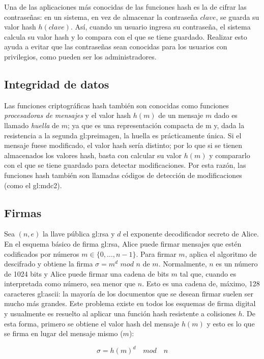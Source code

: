 Una de las aplicaciones más conocidas de las funciones hash es la de
cifrar las contraseñas: en un sistema, en vez de almacenar la contraseña
$clave$, se guarda su valor hash $h(clave)$. Así, cuando un usuario
ingresa su contraseña, el sistema calcula su valor hash y lo compara con
el que se tiene guardado. Realizar esto ayuda a evitar que las
contraseñas sean conocidas para los usuarios con privilegios, como
pueden ser los administradores.

\subsection{Integridad de datos}
Las funciones criptográficas hash también son conocidas como funciones
\textit{procesadoras de mensajes} y el valor hash $h(m)$ de un mensaje
$m$ dado es llamado \textit{huella} de $m$; ya que es una representación
compacta de m y, dada la resistencia a la segunda \gls{gl:preimagen}, la huella
es prácticamente única. Si el mensaje fuese modificado, el valor hash
sería distinto; por lo que si se tienen almacenados los valores hash,
basta con calcular su valor $h(m)$ y compararlo con el que se tiene
guardado para detectar modificaciones. Por esta razón, las funciones
hash también son llamadas códigos de detección de modificaciones (como el 
\acrshort{gl:mdc2}).

\subsection{Firmas}
Sea $(n, e)$ la llave pública \acrshort{gl:rsa} y $d$ el exponente decodificador
secreto de Alice. En el esquema básico de firma \acrshort{gl:rsa}, Alice puede 
firmar mensajes que estén codificados por números $ m \in \{0, \dots, n-1\}$.
Para firmar $m$, aplica el algoritmo de descifrado y obtiene la firma
$\sigma = m^d$ $mod$ $n$ de $m$.
Normalmente, $n$ es un número de 1024 bits y Alice puede firmar una
cadena de bits $m$ tal que, cuando es interpretada como número, sea
menor que $n$. Esto es una cadena de, máximo, 128 caracteres 
\acrshort{gl:ascii}: la mayoría de los documentos que se desean firmar suelen 
ser mucho más grandes. Este problema existe en todos los esquemas de firma 
digital y usualmente es resuelto al aplicar una función hash resistente a
colisiones $h$. De esta forma, primero se obtiene el valor hash del mensaje
$h(m)$ y esto es lo que se firma en lugar del mensaje mismo ($m$):

\begin{equation}
  \label{funcion_hash_sign}
  \sigma = h(m)^d \quad mod \quad n
\end{equation}

